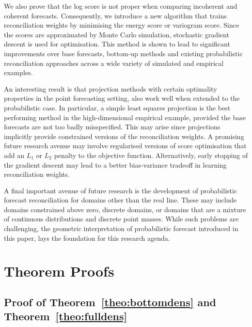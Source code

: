 \documentclass[a4paper,12pt]{article}
\theoremstyle{definition}
\begin{document}
We also prove that the log score is not proper when comparing incoherent and coherent forecasts. Consequently, we introduce a new algorithm that trains reconciliation weights by minimising the energy score or variogram score. Since the scores are approximated by Monte Carlo simulation, stochastic gradient descent is used for optimisation. This method is shown to lead to significant improvements over base forecasts, bottom-up methods and existing probabilistic reconciliation approaches across a wide variety of simulated and empirical examples.

An interesting result is that projection methods with certain optimality properties in the point forecasting setting, also work well when extended to the probabilistic case. In particular, a simple least squares projection is the best performing method in the high-dimensional empirical example, provided the base forecasts are not too badly misspecified. This may arise since projections implicitly provide constrained versions of the reconciliation weights. A promising future research avenue may involve regularised versions of score optimisation that add an $L_1$ or $L_2$ penalty to the objective function. Alternatively, early stopping \citep{BuhYu2003} of the gradient descent may lead to a better bias-variance tradeoff in learning reconciliation weights.

A final important avenue of future research is the development of probabilistic forecast reconciliation for domains other than the real line. These may include domains constrained above zero, discrete domains, or domains that are a mixture of continuous distributions and discrete point masses. While such problems are challenging, the geometric interpretation of probabilistic forecast introduced in this paper, lays the foundation for this research agenda.





\clearpage

\appendix

\section{Theorem Proofs} \label{app:proofs}

\subsection{Proof of Theorem~\ref{theo:bottomdens} and Theorem~\ref{theo:fulldens}} \label{app:Bottom&FullDens}
\end{document}
